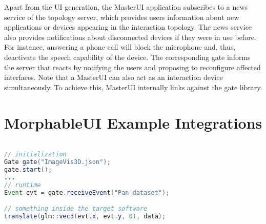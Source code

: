\documentclass[twoside,twocolumn,10pt]{article}
\begin{document}
%
%
Apart from the UI generation, the MasterUI application subscribes to a news service of the topology server, which provides users information about new applications or devices appearing in the interaction topology.
The news service also provides notifications about disconnected devices if they were in use before.
For instance, answering a phone call will block the microphone and, thus, deactivate the speech capability of the device.
The corresponding gate informs the server that reacts by notifying the users and proposing to reconfigure affected interfaces.
Note that a MasterUI can also act as an interaction device simultaneously.
To achieve this, MasterUI internally links against the gate library.









%
%
%
%
%
%
%
%
%


\section{MorphableUI Example Integrations}
\label{sec:results}

\lstset{language=C,
numberstyle=\footnotesize,
basicstyle=\ttfamily\footnotesize,
stepnumber=1,
frame=shadowbox,
breaklines=true}

\begin{lstlisting}[language=java, captionpos=b, belowcaptionskip=4pt, caption={Example integration using the C++ language binding. The gate is initialized with a json file containing a list of requirements or capabilities. During runtime, the target software polls or sends interaction events.}, label={lst:code}]

// initialization
Gate gate("ImageVis3D.json");
gate.start();
...
// runtime
Event evt = gate.receiveEvent("Pan dataset");

// something inside the target software
translate(glm::vec3(evt.x, evt.y, 0), data);
\end{lstlisting}
\end{document}
